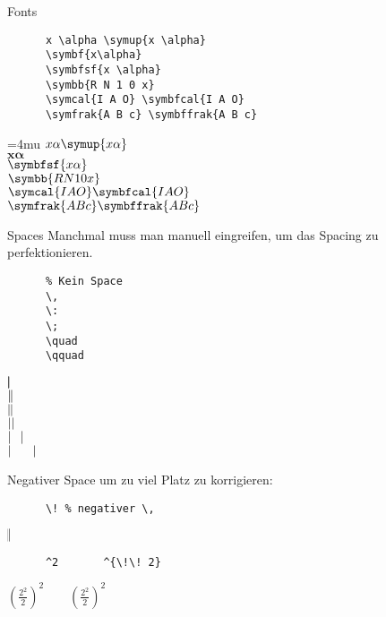 \begin{frame}[fragile]{
  Fonts
  \hfill{}
}
  \begin{CodeExample}{0.70}
    \begin{lstlisting}
      x \alpha \symup{x \alpha}
      \symbf{x\alpha}
      \symbfsf{x \alpha}
      \symbb{R N 1 0 x}
      \symcal{I A O} \symbfcal{I A O}
      \symfrak{A B c} \symbffrak{A B c}
    \end{lstlisting}
  \CodeResult
    \Umathordordspacing\textstyle=4mu
    $x \alpha \symup{x \alpha}$ \\
    $\symbf{x\alpha}$ \\
    $\symbfsf{x \alpha}$ \\
    $\symbb{R N 1 0 x}$ \\
    $\symcal{I A O} \symbfcal{I A O}$ \\
    $\symfrak{A B c} \symbffrak{A B c}$
  \end{CodeExample}
\end{frame}

\begin{frame}[fragile]{Spaces}
  Manchmal muss man manuell eingreifen, um das Spacing zu perfektionieren.
  \vspace{-1em}
  \begin{CodeExample}{0.48}
    \begin{lstlisting}
      % Kein Space
      \,
      \:
      \;
      \quad
      \qquad
    \end{lstlisting}
  \CodeResult
    $|\mspace{-5mu} |$ \\
    $|\mspace{-5mu} \,|$ \\
    $|\mspace{-5mu} \:|$ \\
    $|\mspace{-5mu} \;|$ \\
    $|\mspace{-5mu} \quad|$ \\
    $|\mspace{-5mu} \qquad|$ \\
  \end{CodeExample}
  Negativer Space um zu viel Platz zu korrigieren:
  \vspace{-1em}
  \begin{CodeExample}{0.48}
    \begin{lstlisting}
      \! % negativer \,
    \end{lstlisting}
  \CodeResult
    $|\mspace{-5mu} \!|$
  \end{CodeExample}
  \begin{CodeExample}{0.48}
    \begin{lstlisting}
      ^2       ^{\!\! 2}
    \end{lstlisting}
  \CodeResult
    $\displaystyle \left( \frac{2^2}{2} \right)^2
    \qquad \left( \frac{2^2}{2} \right)^{\!\! 2}$
  \end{CodeExample}
\end{frame}

